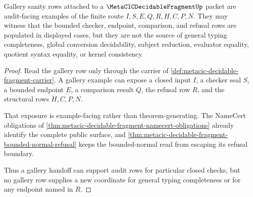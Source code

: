 \begin{theorem}
\label{thm:metacic-decidable-fragment-gallery-handoff}
Gallery sanity rows attached to a $\MetaCICDecidableFragmentUp$ packet are audit-facing examples of the finite route $I,S,E,Q,R,H,C,P,N$. They may witness that the bounded checker, endpoint, comparison, and refusal rows are populated in displayed cases, but they are not the source of general typing completeness, global conversion decidability, subject reduction, evaluator equality, quotient syntax equality, or kernel consistency.
\end{theorem}
\begin{proof}
Read the gallery row only through the carrier of \autoref{def:metacic-decidable-fragment-carrier}. A gallery example can expose a closed input $I$, a checker seal $S$, a bounded endpoint $E$, a comparison result $Q$, the refusal row $R$, and the structural rows $H,C,P,N$.

That exposure is example-facing rather than theorem-generating. The NameCert obligations of \autoref{thm:metacic-decidable-fragment-namecert-obligations} already identify the complete public surface, and \autoref{thm:metacic-decidable-fragment-bounded-normal-refusal} keeps the bounded-normal read from escaping its refusal boundary.

Thus a gallery handoff can support audit rows for particular closed checks, but no gallery row supplies a new coordinate for general typing completeness or for any endpoint named in $R$.
\end{proof}



\begin{closurestatus}{\MetaCICDecidableFragmentUp}
  \theoryclosure{\seedClosure}
  \formalstatus{\unformalizedV}
\end{closurestatus}
